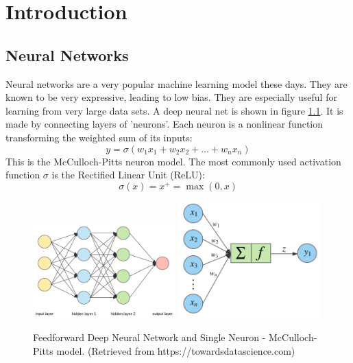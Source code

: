 \chapter{Introduction}
\section{Neural Networks}
Neural networks are a very popular machine learning model these days. They are known to be very expressive, leading to low bias. They are especially useful for learning from very large data sets. A deep neural net is shown in figure \ref{neural}. It is made by connecting layers of 'neurons'. Each neuron is a nonlinear function transforming the weighted sum of its inputs:
\begin{equation*}
      y = \sigma(w_1x_1+w_2x_2+...+w_nx_n)
\end{equation*}
This is the McCulloch-Pitts neuron model. The most commonly used activation function $\sigma$ is the Rectified Linear Unit (ReLU):
\begin{equation*}
      \sigma(x) = x^+ = \max(0,x)
\end{equation*}

   \begin{figure}[b]
	\centering
	\includegraphics[width=0.49\textwidth]{network}
	\includegraphics[width=0.49\textwidth]{neuron}
	\caption{Feedforward Deep Neural Network and Single Neuron - McCulloch-Pitts model. (Retrieved from https://towardsdatascience.com)}
	\label{neural}
	\end{figure}


